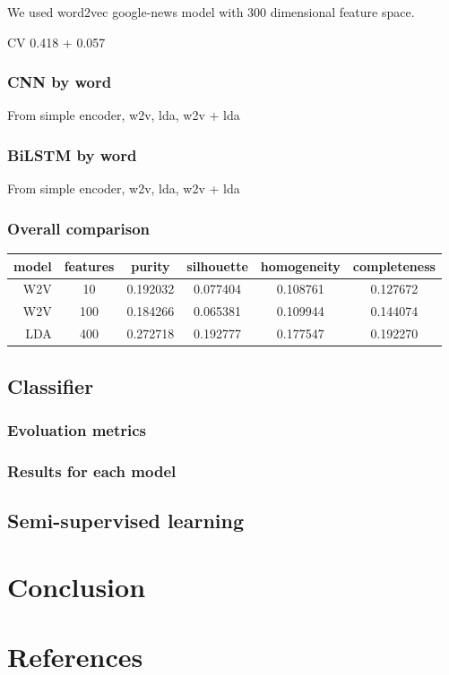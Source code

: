 \documentclass[11pt]{article}
\begin{document}
We used word2vec google-news model with 300 dimensional feature space.


CV 0.418 + 0.057%

\subsubsection{CNN by word}

From simple encoder, w2v, lda, w2v + lda

\subsubsection{BiLSTM by word}

From simple encoder, w2v, lda, w2v + lda

\subsubsection{Overall comparison}

\centering
\begin{tabular}{ |r|c|c|c|c|c| }
\hline
model & features & purity  & silhouette  & homogeneity  & completeness \\ \hline 
W2V & 10   & 0.192032  & 0.077404  & 0.108761  & 0.127672 \\ \hline 
W2V & 100  & 0.184266  & 0.065381  & 0.109944  & 0.144074 \\ \hline 
LDA & 400  & 0.272718  & 0.192777  & 0.177547  & 0.192270 \\ \hline 
\end{tabular}
\FloatBarrier



\subsection{Classifier}

\subsubsection{Evoluation metrics}



\subsubsection{Results for each model}

\subsection{Semi-supervised learning}

\section{Conclusion}


\section{References}


\end{document}

